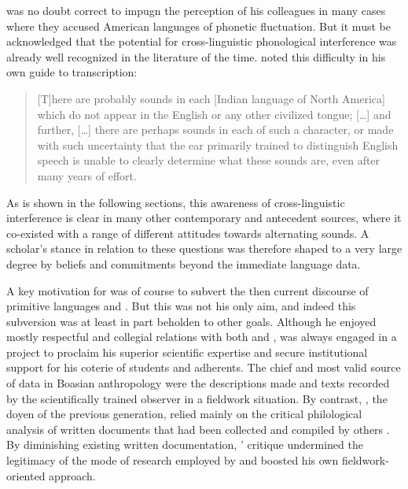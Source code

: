\documentclass[output=paper]{langscibook}
\begin{document}
{\Boas} was no doubt correct to impugn the perception of his colleagues in many cases where they accused American languages of phonetic fluctuation. But it must be acknowledged that the potential for cross-linguistic phonological interference was already well recognized in the literature of the time. \citet[2]{Powell18801877} noted this difficulty in his own guide to transcription:

\begin{quotation}
[T]here are probably sounds in each [Indian language of North America] which do not appear in the English or any other civilized tongue; […] and further, […] there are perhaps sounds in each of such a character, or made with such uncertainty that the ear primarily trained to distinguish English speech is unable to clearly determine what these sounds are, even after many years of effort. \citep[2]{Powell18801877}
\end{quotation}

As is shown in the following sections, this awareness of cross-linguistic interference is clear in many other contemporary and antecedent sources, where it co-existed with a range of different attitudes towards alternating sounds. A scholar's stance in relation to these questions was therefore shaped to a very large degree by beliefs and commitments beyond the immediate language data.

A key motivation for {\Boas} was of course to subvert the then current discourse of primitive languages and . But this was not his only aim, and indeed this subversion was at least in part beholden to other goals. Although he enjoyed mostly respectful and collegial relations with both {\Brinton} and {\Powell}, {\Boas} was always engaged in a project to proclaim his superior scientific expertise and secure institutional support for his coterie of students and adherents. The chief and most valid source of data in Boasian anthropology were the descriptions made and texts recorded by the scientifically trained observer in a fieldwork situation. By contrast, {\Brinton}, the doyen of the previous generation, relied mainly on the critical philological analysis of written documents that had been collected and compiled by others \citep[see][21--24]{Darnell1988}. By diminishing existing written documentation, {\Boas}' critique undermined the legitimacy of the mode of research employed by {\Brinton} and boosted his own fieldwork-oriented approach.
\end{document}
